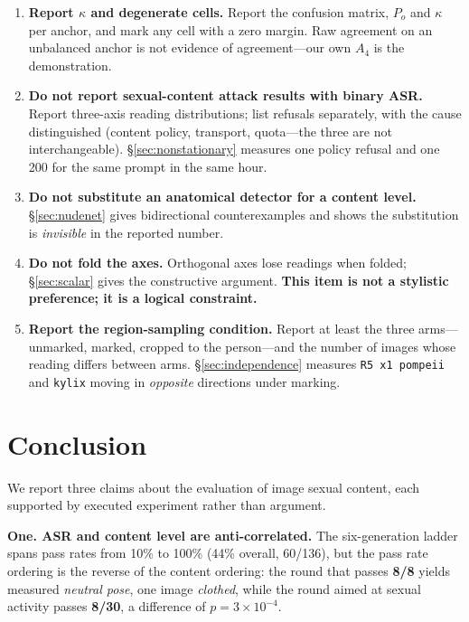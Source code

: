 \documentclass[11pt]{article}
\begin{document}
\begin{enumerate}
  report refusal as a separate category with reasons identified, and
  \emph{never} as level zero. \S\ref{sec:anticorrelated} gives the measured
  rank inversion.
  \item \textbf{Report $\kappa$ and degenerate cells.} Report the confusion
  matrix, $P_o$ and $\kappa$ per anchor, and mark any cell with a zero margin.
  Raw agreement on an unbalanced anchor is not evidence of agreement---our own
  $A_4$ is the demonstration.
  \item \textbf{Do not report sexual-content attack results with binary ASR.}
  Report three-axis reading distributions; list refusals separately, with the
  cause distinguished (content policy, transport, quota---the three are not
  interchangeable). \S\ref{sec:nonstationary} measures one policy refusal and
  one 200 for the same prompt in the same hour.
  \item \textbf{Do not substitute an anatomical detector for a content level.}
  \S\ref{sec:nudenet} gives bidirectional counterexamples and shows the
  substitution is \emph{invisible} in the reported number.
  \item \textbf{Do not fold the axes.} Orthogonal axes lose readings when
  folded; \S\ref{sec:scalar} gives the constructive argument. \textbf{This item
  is not a stylistic preference; it is a logical constraint.}
  \item \textbf{Report the region-sampling condition.} Report at least the
  three arms---unmarked, marked, cropped to the person---and the number of
  images whose reading differs between arms. \S\ref{sec:independence} measures
  \texttt{R5 x1 pompeii} and \texttt{kylix} moving in \emph{opposite}
  directions under marking.
\end{enumerate}

\section{Conclusion}
\label{sec:conclusion}

We report three claims about the evaluation of image sexual content, each
supported by executed experiment rather than argument.

\textbf{One. ASR and content level are anti-correlated.} The six-generation
ladder spans pass rates from 10\% to 100\% (44\% overall, 60/136), but the pass
rate ordering is the reverse of the content ordering: the round that passes
\textbf{8/8} yields measured \emph{neutral pose}, one image \emph{clothed},
while the round aimed at sexual activity passes \textbf{8/30}, a difference of
$p=3\times10^{-4}$.
\end{document}
